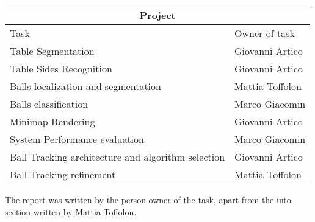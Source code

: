 \begin{tabular}{ |p{6cm}||p{3cm}|  }
 \hline
 \multicolumn{2}{|c|}{Project} \\
 \hline
 Task & Owner of task \\
 \hline
 Table Segmentation   & Giovanni Artico\\
 \hline
 Table Sides Recognition &  Giovanni Artico\\
 \hline
 Balls localization and segmentation & Mattia Toffolon\\
 \hline
 Balls classification & Marco Giacomin\\
 \hline
 Minimap Rendering & Giovanni Artico\\
 \hline
 System Performance evaluation & Marco Giacomin\\
 \hline
 Ball Tracking architecture and algorithm selection & Giovanni Artico\\
 \hline
 Ball Tracking refinement & Mattia Toffolon\\
 \hline
\end{tabular}
\par
The report was written by the person owner of the task, apart from
the into section written by Mattia Toffolon.

